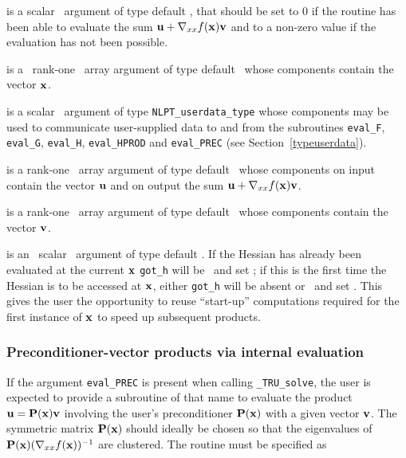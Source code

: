 \documentclass{galahad}
\newcommand{\packagename}{TRU}
\newcommand{\fullpackagename}{\libraryname\_\packagename}
\newcommand{\solver}{{\tt \fullpackagename\_solve}}
\begin{document}
\begin{description}
 is a scalar \intentout\ argument of type default \integer,
that should be set to 0 if the routine has been able to evaluate the
sum ${\mathbf{u}} + \nabla_{xx} f({\mathbf{x}}) {\mathbf{v}}$
and to a non-zero value if the evaluation has not been possible.

 is a \ rank-one \intentin\ array argument of type
default \realdp\ whose components contain the vector ${\mathbf{x}}$.

 is a scalar \intentinout\ argument of type
{\tt NLPT\_userdata\_type} whose components may be used
to communicate user-supplied data to and from the
subroutines {\tt eval\_F}, {\tt eval\_G},
{\tt eval\_H}, {\tt eval\_HPROD} and {\tt eval\_PREC}
(see Section~\ref{typeuserdata}).

 is a rank-one \intentinout\ array argument of type default \realdp\
whose components on input contain the vector ${\mathbf{u}}$ and on output the
sum ${\mathbf{u}} + \nabla_{xx} f({\mathbf{x}}) {\mathbf{v}}$.

 is a rank-one \intentin\ array argument of type default \realdp\
whose components contain the vector ${\mathbf{v}}$.

 is an \optional\ scalar \intentin\ argument of type default
\logical. If the Hessian has already been evaluated at the current ${\mathbf{x}}$
{\tt got\_h} will be \present\ and set \true; if this is the first time
the Hessian is to be accessed at ${\mathbf{x}}$, either {\tt got\_h} will be absent
or \present\ and set \false. This gives the user the opportunity
to reuse ``start-up'' computations required for the first instance of
${\mathbf{x}}$ to speed up subsequent products.

\end{description}


\subsubsection{Preconditioner-vector products via internal evaluation\label{pv}}

If the argument {\tt eval\_PREC} is present when calling \solver, the
user is expected to provide a subroutine of that name to evaluate the
product ${\mathbf{u}} = {\mathbf{P}}({\mathbf{x}}) {\mathbf{v}}$ involving the user's preconditioner
${\mathbf{P}}({\mathbf{x}})$ with a given vector ${\mathbf{v}}$. The symmetric matrix ${\mathbf{P}}({\mathbf{x}})$
should ideally be chosen so that the eigenvalues of
${\mathbf{P}}({\mathbf{x}}) (\nabla_{xx} f({\mathbf{x}}))^{-1}$ are clustered.
The routine must be specified as
\end{document}
